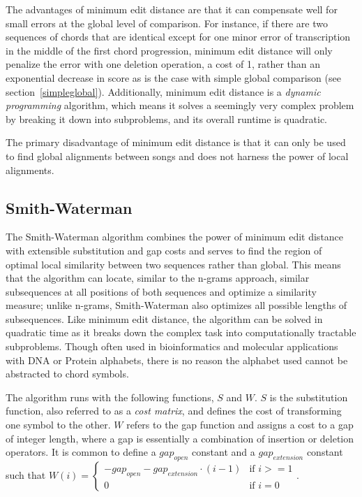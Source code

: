 The advantages of minimum edit distance are that it can compensate well for small errors at the global level of comparison. For instance, if there are two sequences of chords that are identical except for one minor error of transcription in the middle of the first chord progression, minimum edit distance will only penalize the error with one deletion operation, a cost of 1, rather than an exponential decrease in score as is the case with simple global comparison (see section~\ref{simpleglobal}). Additionally, minimum edit distance is a \textit{dynamic programming} algorithm, which means it solves a seemingly very complex problem by breaking it down into subproblems, and its overall runtime is quadratic.

The primary disadvantage of minimum edit distance is that it can only be used to find global alignments between songs and does not harness the power of local alignments.

\subsection{Smith-Waterman}

The Smith-Waterman algorithm\cite{smith1981identification} combines the power of minimum edit distance with extensible substitution and gap costs and serves to find the region of optimal local similarity between two sequences rather than global. This means that the algorithm can locate, similar to the n-grams approach, similar subsequences at all positions of both sequences and optimize a similarity measure; unlike n-grams, Smith-Waterman also optimizes all possible lengths of subsequences. Like minimum edit distance, the algorithm can be solved in quadratic time as it breaks down the complex task into computationally tractable subproblems. Though often used in bioinformatics and molecular applications with DNA or Protein alphabets, there is no reason the alphabet used cannot be abstracted to chord symbols.

The algorithm runs with the following functions, $S$ and $W$. $S$ is the substitution function, also referred to as a \textit{cost matrix}, and defines the cost of transforming one symbol to the other. $W$ refers to the gap function and assigns a cost to a gap of integer length, where a gap is essentially a combination of insertion or deletion operators. It is common to define a ${gap}_{open}$ constant and a ${gap}_{extension}$ constant such that $W(i) = \begin{cases} -{gap}_{open} - {gap}_{extension} \cdot (i - 1) &\text{if }i >= 1 \\ 0 &\text{if }i = 0 \end{cases}$.

